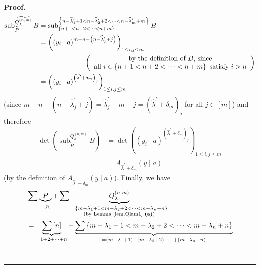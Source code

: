 \documentclass[numbers=enddot,12pt,final,onecolumn,notitlepage]{scrartcl}%
\theoremstyle{definition}
\newenvironment{proof}[1][Proof]{\noindent\textbf{#1.} }{\ \rule{0.5em}{0.5em}}
\let\sumnonlimits\sum
\renewcommand{\sum}{\sumnonlimits\limits}
\begin{document}
\begin{enumerate}
\begin{proof}
\begin{align*}
\operatorname*{sub}\nolimits_{\widetilde{P}}^{\widetilde{Q_{\lambda}^{\left(
n,m\right)  }}}B  &  =\operatorname*{sub}\nolimits_{\left\{  n+1<n+2<\cdots
<n+m\right\}  }^{\left\{  n-\widehat{\lambda}_{1}^{\prime}%
+1<n-\widehat{\lambda}_{2}^{\prime}+2<\cdots<n-\widehat{\lambda}_{m}^{\prime
}+m\right\}  }B\\
&  =\left(  \left(  y_{i}\mid a\right)  ^{m+n-\left(  n-\widehat{\lambda}%
_{j}^{\prime}+j\right)  }\right)  _{1\leq i,j\leq m}\\
&  \ \ \ \ \ \ \ \ \ \ \ \ \ \ \ \ \ \ \ \ \left(
\begin{array}
[c]{c}%
\text{by the definition of }B\text{, since}\\
\text{all }i\in\left\{  n+1<n+2<\cdots<n+m\right\}  \text{ satisfy }i>n
\end{array}
\right) \\
&  =\left(  \left(  y_{i}\mid a\right)  ^{\left(  \widehat{\lambda}^{\prime
}+\delta_{m}\right)  _{j}}\right)  _{1\leq i,j\leq m}%
\end{align*}
(since $m+n-\left(  n-\widehat{\lambda}_{j}^{\prime}+j\right)
=\widehat{\lambda}_{j}^{\prime}+m-j=\left(  \widehat{\lambda}^{\prime}%
+\delta_{m}\right)  _{j}$ for all $j\in\left[  m\right]  $) and therefore%
\begin{align}
\det\left(  \operatorname*{sub}\nolimits_{\widetilde{P}}%
^{\widetilde{Q_{\lambda}^{\left(  n,m\right)  }}}B\right)   &  =\det\left(
\left(  y_{i}\mid a\right)  ^{\left(  \widehat{\lambda}^{\prime}+\delta
_{m}\right)  _{j}}\right)  _{1\leq i,j\leq m}\nonumber\\
&  =A_{\widehat{\lambda}^{\prime}+\delta_{m}}\left(  y\mid a\right)
\label{p20.claim.pf.l3}%
\end{align}
(by the definition of $A_{\widehat{\lambda}^{\prime}+\delta_{m}}\left(  y\mid
a\right)  $). Finally, we have%
\begin{align*}
&  \sum\underbrace{P}_{=\left[  n\right]  }+\sum\underbrace{Q_{\lambda
}^{\left(  n,m\right)  }}_{\substack{=\left\{  m-\lambda_{1}+1<m-\lambda
_{2}+2<\cdots<m-\lambda_{n}+n\right\}  \\\text{(by Lemma \ref{lem.Qlam1}
\textbf{(a)})}}}\\
&  =\underbrace{\sum\left[  n\right]  }_{=1+2+\cdots+n}+\underbrace{\sum
\left\{  m-\lambda_{1}+1<m-\lambda_{2}+2<\cdots<m-\lambda_{n}+n\right\}
}_{=\left(  m-\lambda_{1}+1\right)  +\left(  m-\lambda_{2}+2\right)
+\cdots+\left(  m-\lambda_{n}+n\right)  }\\

\end{align*}
\end{proof}
\end{enumerate}
\end{document}
